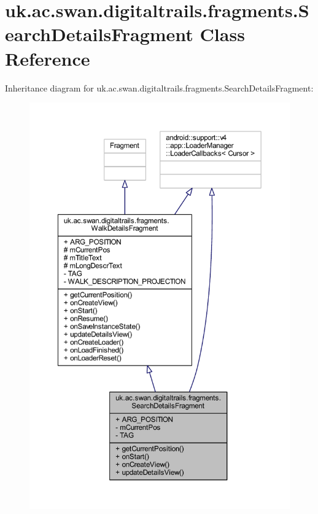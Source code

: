 \hypertarget{classuk_1_1ac_1_1swan_1_1digitaltrails_1_1fragments_1_1_search_details_fragment}{\section{uk.\+ac.\+swan.\+digitaltrails.\+fragments.\+Search\+Details\+Fragment Class Reference}
\label{classuk_1_1ac_1_1swan_1_1digitaltrails_1_1fragments_1_1_search_details_fragment}
}


Inheritance diagram for uk.\+ac.\+swan.\+digitaltrails.\+fragments.\+Search\+Details\+Fragment\+:
\nopagebreak
\begin{figure}[H]
\begin{center}
\leavevmode
\includegraphics[width=350pt]{classuk_1_1ac_1_1swan_1_1digitaltrails_1_1fragments_1_1_search_details_fragment__inherit__graph}
\end{center}
\end{figure}


